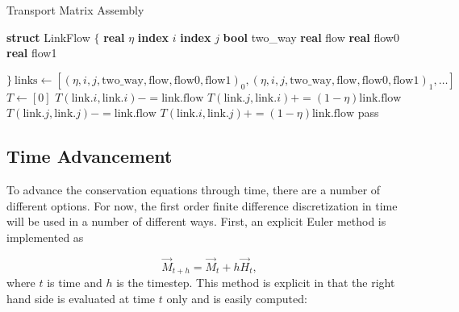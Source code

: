 \documentclass[10pt]{report}
\newcommand{\pluseq}{\ensuremath{\mathrel{+}=}}
\newcommand{\minuseq}{\ensuremath{\mathrel{-}=}}
\newcommand{\IndentedState}[1]{\State\hspace{\algorithmicindent} #1}
\begin{document}
\begin{algorithm}
  \caption{Transport Matrix Assembly}\label{TransportAssembly}
  \begin{algorithmic}[1]
    \State \textbf{struct} LinkFlow $\{$
        \IndentedState \textbf{real} $\eta$
        \IndentedState \textbf{index} $i$
        \IndentedState \textbf{index} $j$
        \IndentedState \textbf{bool} two\_way
        \IndentedState \textbf{real} flow
        \IndentedState \textbf{real} flow0
        \IndentedState \textbf{real} flow1
        
    \State  $\}\ \text{links} \gets [(\eta, i, j, \text{two\_way}, \text{flow}, \text{flow0}, \text{flow1})_0, (\eta, i, j, \text{two\_way}, \text{flow}, \text{flow0}, \text{flow1})_1, \ldots]$
    \State $T \gets [0]$
            \State $T(\text{link}.i, \text{link}.i) \minuseq \text{link.flow}$
            \State $T(\text{link}.j, \text{link}.i) \pluseq \left(1-\eta\right) \text{link.flow}$
        \Else
            \State $T(\text{link}.j, \text{link}.j) \minuseq \text{link.flow}$
            \State $T(\text{link}.i, \text{link}.j) \pluseq \left(1-\eta\right) \text{link.flow}$
        \EndIf
      \Else
          \State pass
      \EndIf
    \EndFor
  \end{algorithmic}
\end{algorithm}
 
\subsection{Time Advancement}
To advance the conservation equations through time, there are a number of
different options. For now, the first order finite difference discretization in
time will be used in a number of different ways. First, an explicit Euler method
is implemented as

\begin{equation}
\vec{M}_{t+h} = \vec{M}_t + h\vec{H}_t,
\end{equation}
\noindent
where $t$ is time and $h$ is the timestep. This method is explicit in that the right hand side
is evaluated at time $t$ only and is easily computed:
\end{document}
